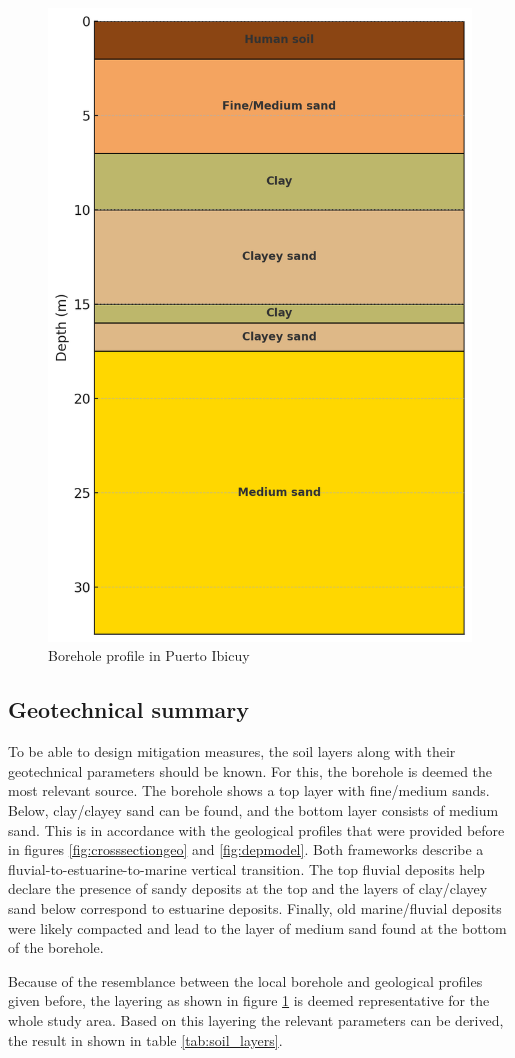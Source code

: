 \begin{figure}[H]
    \centering
    \includegraphics[width=0.45\linewidth]{figures//ch9/Bodemprofiel.png}
    \caption{Borehole profile in Puerto Ibicuy \autocite{amatoESTRATIGRAFIACUATERNARIASUBSUELO2009}}
    \label{fig:borehole}
\end{figure}

\subsection{Geotechnical summary}
To be able to design mitigation measures, the soil layers along with their geotechnical parameters should be known. For this, the borehole is deemed the most relevant source. The borehole shows a top layer with fine/medium sands. Below, clay/clayey sand can be found, and the bottom layer consists of medium sand. This is in accordance with the geological profiles that were provided before in figures \ref{fig:crosssectiongeo} and \ref{fig:depmodel}. Both frameworks describe a fluvial-to-estuarine-to-marine vertical transition. The top fluvial deposits help declare the presence of sandy deposits at the top and the layers of clay/clayey sand below correspond to estuarine deposits. Finally, old marine/fluvial deposits were likely compacted and lead to the layer of medium sand found at the bottom of the borehole.

Because of the resemblance between the local borehole and geological profiles given before, the layering as shown in figure \ref{fig:borehole} is deemed representative for the whole study area. Based on this layering the relevant parameters can be derived, the result in shown in table \ref{tab:soil_layers}.

